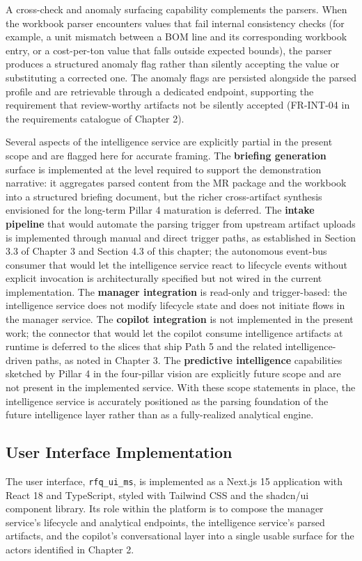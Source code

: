 A cross-check and anomaly surfacing capability complements the parsers. When the workbook parser encounters values that fail internal consistency checks (for example, a unit mismatch between a BOM line and its corresponding workbook entry, or a cost-per-ton value that falls outside expected bounds), the parser produces a structured anomaly flag rather than silently accepting the value or substituting a corrected one. The anomaly flags are persisted alongside the parsed profile and are retrievable through a dedicated endpoint, supporting the requirement that review-worthy artifacts not be silently accepted (FR-INT-04 in the requirements catalogue of Chapter 2).

Several aspects of the intelligence service are explicitly partial in the present scope and are flagged here for accurate framing. The \textbf{briefing generation} surface is implemented at the level required to support the demonstration narrative: it aggregates parsed content from the MR package and the workbook into a structured briefing document, but the richer cross-artifact synthesis envisioned for the long-term Pillar 4 maturation is deferred. The \textbf{intake pipeline} that would automate the parsing trigger from upstream artifact uploads is implemented through manual and direct trigger paths, as established in Section 3.3 of Chapter 3 and Section 4.3 of this chapter; the autonomous event-bus consumer that would let the intelligence service react to lifecycle events without explicit invocation is architecturally specified but not wired in the current implementation. The \textbf{manager integration} is read-only and trigger-based: the intelligence service does not modify lifecycle state and does not initiate flows in the manager service. The \textbf{copilot integration} is not implemented in the present work; the connector that would let the copilot consume intelligence artifacts at runtime is deferred to the slices that ship Path 5 and the related intelligence-driven paths, as noted in Chapter 3. The \textbf{predictive intelligence} capabilities sketched by Pillar 4 in the four-pillar vision are explicitly future scope and are not present in the implemented service. With these scope statements in place, the intelligence service is accurately positioned as the parsing foundation of the future intelligence layer rather than as a fully-realized analytical engine.

\subsection*{User Interface Implementation}
The user interface, \texttt{rfq\_ui\_ms}, is implemented as a Next.js 15 application with React 18 and TypeScript, styled with Tailwind CSS and the shadcn/ui component library. Its role within the platform is to compose the manager service's lifecycle and analytical endpoints, the intelligence service's parsed artifacts, and the copilot's conversational layer into a single usable surface for the actors identified in Chapter 2.

